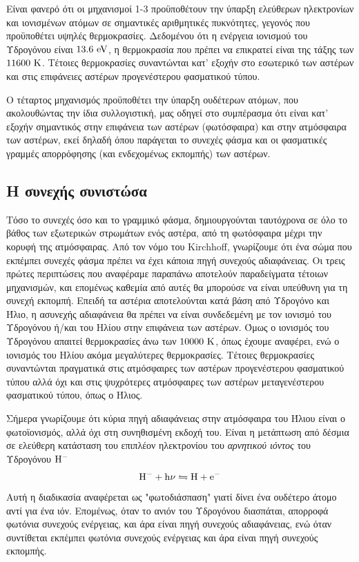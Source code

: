 Είναι φανερό ότι οι μηχανισμοί 1-3 προϋποθέτουν την ύπαρξη ελεύθερων ηλεκτρονίων και ιονισμένων ατόμων σε σημαντικές αριθμητικές πυκνότητες, γεγονός που προϋποθέτει υψηλές θερμοκρασίες. Δεδομένου ότι η ενέργεια ιονισμού του Υδρογόνου είναι $\rm 13.6 \ eV$, η θερμοκρασία που πρέπει να επικρατεί είναι της τάξης των $\rm 11600 \ K$. Τέτοιες θερμοκρασίες συναντώνται κατ' εξοχήν στο εσωτερικό των αστέρων  και στις επιφάνειες αστέρων προγενέστερου φασματικού τύπου. 

Ο τέταρτος μηχανισμός προϋποθέτει την ύπαρξη ουδέτερων ατόμων, που ακολουθώντας την ίδια συλλογιστική, μας οδηγεί στο συμπέρασμα ότι είναι κατ' εξοχήν σημαντικός στην επιφάνεια των αστέρων (φωτόσφαιρα) και στην ατμόσφαιρα των αστέρων, εκεί δηλαδή όπου παράγεται το συνεχές φάσμα και οι φασματικές γραμμές απορρόφησης (και ενδεχομένως εκπομπής) των αστέρων.

\subsection{Η συνεχής συνιστώσα}
Τόσο το συνεχές όσο και το γραμμικό φάσμα, δημιουργούνται ταυτόχρονα σε όλο το βάθος των εξωτερικών στρωμάτων ενός αστέρα, από τη φωτόσφαιρα μέχρι την κορυφή της ατμόσφαιρας.
Από τον νόμο του Kirchhoff, γνωρίζουμε ότι ένα σώμα που εκπέμπει συνεχές φάσμα πρέπει να έχει κάποια πηγή συνεχούς αδιαφάνειας. Οι τρεις πρώτες περιπτώσεις που αναφέραμε παραπάνω αποτελούν παραδείγματα τέτοιων μηχανισμών, και επομένως καθεμία από αυτές θα μπορούσε να είναι υπεύθυνη για τη συνεχή εκπομπή. Επειδή τα αστέρια αποτελούνται κατά βάση από Υδρογόνο και Ήλιο, η ασυνεχής αδιαφάνεια θα πρέπει να είναι συνδεδεμένη με τον ιονισμό του Υδρογόνου ή/και του Ηλίου στην επιφάνεια των αστέρων. Όμως ο ιονισμός του Υδρογόνου απαιτεί θερμοκρασίες άνω των $\rm 10000 \ K$, όπως έχουμε αναφέρει, ενώ ο ιονισμός του Ηλίου ακόμα μεγαλύτερες θερμοκρασίες. Τέτοιες θερμοκρασίες συναντώνται πραγματικά στις ατμόσφαιρες των αστέρων προγενέστερου φασματικού τύπου αλλά όχι και στις ψυχρότερες ατμόσφαιρες των αστέρων μεταγενέστερου φασματικού τύπου, όπως ο Ήλιος.

Σήμερα γνωρίζουμε ότι κύρια πηγή αδιαφάνειας στην ατμόσφαιρα του Ήλιου είναι ο φωτοϊονισμός, αλλά όχι στη συνηθισμένη εκδοχή του. Είναι η μετάπτωση από δέσμια σε ελεύθερη κατάσταση του επιπλέον ηλεκτρονίου του \textit{αρνητικού ιόντος} του Υδρογόνου $\rm H^{-}$
$$\rm H^{-} + h\nu \leftrightharpoons H + e^{-}$$
Αυτή η διαδικασία αναφέρεται ως "φωτοδιάσπαση" γιατί δίνει ένα ουδέτερο άτομο αντί για ένα ιόν. Επομένως, όταν το ανιόν του Υδρογόνου διασπάται, απορροφά φωτόνια συνεχούς ενέργειας, και άρα είναι πηγή συνεχούς αδιαφάνειας, ενώ όταν συντίθεται εκπέμπει φωτόνια συνεχούς ενέργειας και άρα είναι πηγή συνεχούς εκπομπής.


